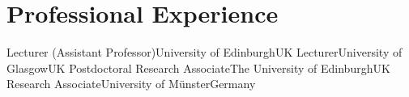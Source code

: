 \section{Professional Experience}
        {Lecturer (Assistant Professor)}{University of Edinburgh}{UK}{}{}
        {Lecturer}{University of Glasgow}{UK}{}{}
        {Postdoctoral Research Associate}{The University of Edinburgh}{UK}{}{}
        {Research Associate}{University of Münster}{Germany}{}{}